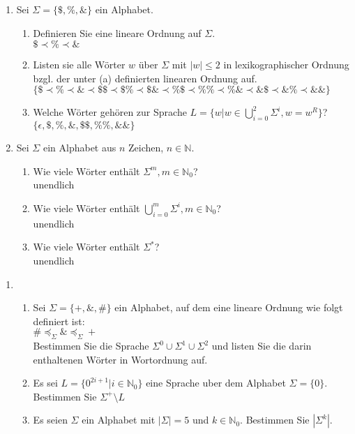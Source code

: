 \documentclass{scrartcl}
\begin{document}
\begin{enumerate}
\begin{enumerate}[label*=\arabic*.]
\item Sei $\Sigma = \{\$,\%,\&\}$ ein Alphabet.
\begin{enumerate}[label=(\alph*)]
\item Definieren Sie eine lineare Ordnung auf $\Sigma$.
\\ $\$ \prec \% \prec \&$
\item Listen sie alle Wörter $w$ über $\Sigma$ mit $|w| \leq 2$ in lexikographischer Ordnung bzgl. der unter (a) definierten linearen Ordnung auf.
\\ $\{\$ \prec \% \prec \& \prec \$\$ \prec \$\% \prec \$\& \prec \%\$ \prec \%\% \prec \%\& \prec \&\$ \prec \&\% \prec \&\&\}$
\item Welche Wörter gehören zur Sprache $L = \{w | w \in \bigcup\limits_{i=0}^2 \Sigma^i, w = w^R\}$?
\\ $\{\epsilon,\$,\%,\&,\$\$,\%\%,\&\&\}$
\end{enumerate}

\pagebreak

\item Sei $\Sigma$ ein Alphabet aus $n$ Zeichen, $n \in \mathbb{N}$.
\begin{enumerate}[label=(\alph*)]
\item Wie viele Wörter enthält $\Sigma^m, m \in \mathbb{N}_0$?
\\ unendlich
\item Wie viele Wörter enthält $\bigcup\limits_{i=0}^{m} \Sigma^i, m \in \mathbb{N}_0$?
\\ unendlich
\item Wie viele Wörter enthält $\Sigma^*$?
\\ unendlich
\end{enumerate}
\end{enumerate}
\end{enumerate}

\pagebreak

\begin{enumerate}
\item
\begin{enumerate}[label=(\alph*)]
\item 
Sei $\Sigma = \{+,\&,\#\}$ ein Alphabet, auf dem eine lineare Ordnung wie folgt definiert ist:
\\ $\# \preceq_\Sigma \& \preceq_\Sigma +$ \\
Bestimmen Sie die Sprache $\Sigma^0 \cup \Sigma^1 \cup \Sigma^2$ und listen Sie die darin enthaltenen Wörter in Wortordnung auf.
\item Es sei $L = \{0^{2i+1} | i \in \mathbb{N}_0\}$ eine Sprache uber dem Alphabet $\Sigma = \{0\}$.
\\ Bestimmen Sie $\Sigma^+ \setminus L$
\item  Es seien $\Sigma$ ein Alphabet mit $|\Sigma| = 5$ und $k \in \mathbb{N}_0$.
Bestimmen Sie $|\Sigma^k|$.
\end{enumerate}
\end{enumerate}
\end{document}
